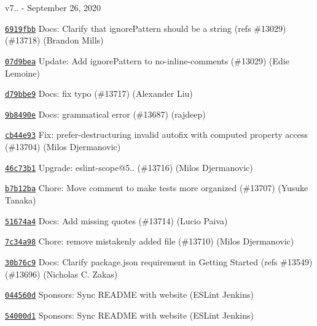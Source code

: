 v7.. -\/ September 26, 2020


\begin{DoxyItemize}
\item \href{https://github.com/eslint/eslint/commit/6919fbb83f86552b0f49ae749da866e4edc7c46a}{\texttt{ {\ttfamily 6919fbb}}} Docs\+: Clarify that ignore\+Pattern should be a string (refs \#13029) (\#13718) (Brandon Mills)
\item \href{https://github.com/eslint/eslint/commit/07d9bea7c6f953e8f754afffc9752edcee799431}{\texttt{ {\ttfamily 07d9bea}}} Update\+: Add ignore\+Pattern to no-\/inline-\/comments (\#13029) (Edie Lemoine)
\item \href{https://github.com/eslint/eslint/commit/d79bbe982930b53358d34ad91cc6e5eaac8ddede}{\texttt{ {\ttfamily d79bbe9}}} Docs\+: fix typo (\#13717) (Alexander Liu)
\item \href{https://github.com/eslint/eslint/commit/9b8490ee6391c986b1314540a92b71d8c1e0efc4}{\texttt{ {\ttfamily 9b8490e}}} Docs\+: grammatical error (\#13687) (rajdeep)
\item \href{https://github.com/eslint/eslint/commit/cb44e93f4780e925a75a68ce2f7f6d065b5f756c}{\texttt{ {\ttfamily cb44e93}}} Fix\+: prefer-\/destructuring invalid autofix with computed property access (\#13704) (Milos Djermanovic)
\item \href{https://github.com/eslint/eslint/commit/46c73b159a5ceed2f7f26f254fd97e459fb0e81a}{\texttt{ {\ttfamily 46c73b1}}} Upgrade\+: eslint-\/scope@5.. (\#13716) (Milos Djermanovic)
\item \href{https://github.com/eslint/eslint/commit/b7b12ba0bd4e9c66883f11e97de8ed84b600cdaa}{\texttt{ {\ttfamily b7b12ba}}} Chore\+: Move comment to make tests more organized (\#13707) (Yusuke Tanaka)
\item \href{https://github.com/eslint/eslint/commit/51674a4113a1ca877094606bbf4938ab06cc1aad}{\texttt{ {\ttfamily 51674a4}}} Docs\+: Add missing quotes (\#13714) (Lucio Paiva)
\item \href{https://github.com/eslint/eslint/commit/7c34a982aaf93a02348f56c9ce887c7dcf51b5bd}{\texttt{ {\ttfamily 7c34a98}}} Chore\+: remove mistakenly added file (\#13710) (Milos Djermanovic)
\item \href{https://github.com/eslint/eslint/commit/30b76c9a13fae3dff59f7db406d6c66f11152973}{\texttt{ {\ttfamily 30b76c9}}} Docs\+: Clarify package.\+json requirement in Getting Started (refs \#13549) (\#13696) (Nicholas C. Zakas)
\item \href{https://github.com/eslint/eslint/commit/044560dcc74db98b28e293da2e2f3b41ecbf5884}{\texttt{ {\ttfamily 044560d}}} Sponsors\+: Sync README with website (ESLint Jenkins)
\item \href{https://github.com/eslint/eslint/commit/54000d13f27d5255851b5ac0606ad027e2b8d331}{\texttt{ {\ttfamily 54000d1}}} Sponsors\+: Sync README with website (ESLint Jenkins)
\end{DoxyItemize}

